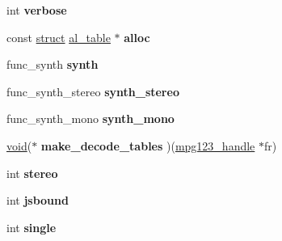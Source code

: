 \begin{DoxyCompactItemize}
\begin{tabbing}
\end{tabbing}\item 
\mbox{\label{structmpg123__handle__struct_aeee3a609173d0199f2ff0038224d2dc3}} 
int {\bfseries verbose}
\item 
\mbox{\label{structmpg123__handle__struct_a622c9dd3148fbb160c90a0f1d9472d40}} 
const \hyperlink{interfacestruct}{struct} \hyperlink{structal__table}{al\+\_\+table} $\ast$ {\bfseries alloc}
\item 
\mbox{\label{structmpg123__handle__struct_a7087a73d019e900fb986a79a2840d08c}} 
func\+\_\+synth {\bfseries synth}
\item 
\mbox{\label{structmpg123__handle__struct_a448107ceb3b7c23ecc8c1c193d8022c2}} 
func\+\_\+synth\+\_\+stereo {\bfseries synth\+\_\+stereo}
\item 
\mbox{\label{structmpg123__handle__struct_a0d99a6b497aa47fc86082c75959cfa75}} 
func\+\_\+synth\+\_\+mono {\bfseries synth\+\_\+mono}
\item 
\mbox{\label{structmpg123__handle__struct_afe70bdb6e4c8da73e869eb919f4c1e51}} 
\hyperlink{interfacevoid}{void}($\ast$ {\bfseries make\+\_\+decode\+\_\+tables} )(\hyperlink{group__mpg123__init_ga6728e2839a395f3a07d4514da659faca}{mpg123\+\_\+handle} $\ast$fr)
\item 
\mbox{\label{structmpg123__handle__struct_a2cbfc408f5461191a069f273757ec1b2}} 
int {\bfseries stereo}
\item 
\mbox{\label{structmpg123__handle__struct_ac5d85ca6b3ba28da305d712f929ee00b}} 
int {\bfseries jsbound}
\item 
\mbox{\label{structmpg123__handle__struct_a218cf7967d099a674345670ad546f042}} 
int {\bfseries single}
\item 
\mbox{\label{structmpg123__handle__struct_ab0e190d469f27aa22849a868ca21ccab}} 

\end{DoxyCompactItemize}
